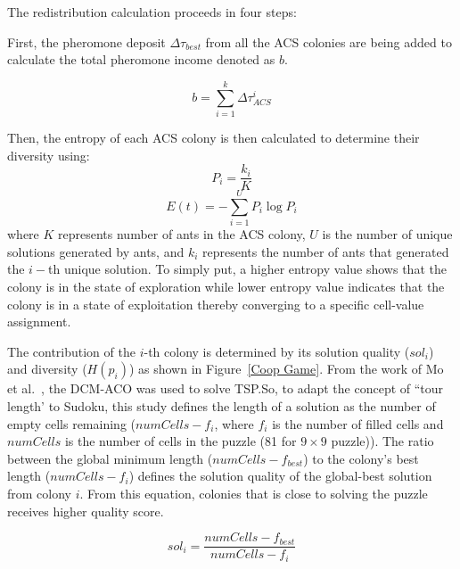         The redistribution calculation proceeds in four steps:

        First, the pheromone deposit $\Delta \tau_{best}$ from all the ACS colonies are being added to calculate the total pheromone income denoted as $b$. 

        \begin{equation}
        b = \sum_{i=1}^{k} \Delta \tau_{ACS}^{i}
        \end{equation}

        Then, the entropy of each ACS colony is then calculated to determine their diversity using:
            \begin{equation} 
            P_i = \frac{k_i}{K} 
            \label{eqn:coop_game_2}
            \end{equation}
            \begin{equation} 
            E(t) = - \sum_{i=1}^{U} P_i \log P_i
            \label{eqn:coop_game_3}
            \end{equation}
        where $K$ represents number of ants in the ACS colony, $U$ is the number of unique solutions generated by ants, and $k_i$ represents the number of ants that generated the $i-$th unique solution. To simply put, a higher entropy value shows that the colony is in the state of exploration while lower entropy value indicates that the colony is in a state of exploitation thereby converging to a specific cell-value assignment. 
              
        The contribution of the $i$-th colony is determined by its solution quality ($sol_i$) and diversity ($H(p_i)$) as shown in Figure~\ref{Coop Game}. From the work of Mo et al.~\cite{mo2022}, the DCM-ACO was used to solve TSP.\@ So, to adapt the concept of ``tour length' to Sudoku, this study defines the length of a solution as the number of empty cells remaining ($numCells - f_i$, where $f_i$ is the number of filled cells and $numCells$ is the number of cells in the puzzle (81 for $9 \times 9$ puzzle)). The ratio between the global minimum length ($numCells - f_{best}$) to the colony's best length ($numCells - f_{i}$) defines the solution quality of the global-best solution from colony $i$. From this equation, colonies that is close to solving the puzzle receives higher quality score.

            \begin{equation}
            sol_i = \frac{numCells - f_{best}}{numCells - f_{i}}
            \end{equation}
            

